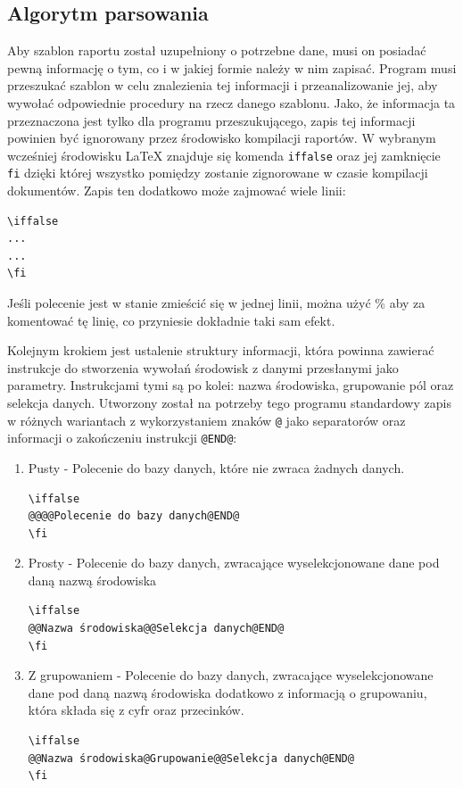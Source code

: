 \subsection{Algorytm parsowania}
Aby szablon raportu został uzupełniony o potrzebne dane, musi on posiadać pewną informację o tym, co i w jakiej formie należy w nim zapisać.  Program musi przeszukać szablon w celu znalezienia tej informacji i przeanalizowanie jej, aby wywołać odpowiednie procedury na rzecz danego szablonu. Jako, że informacja ta przeznaczona jest tylko dla programu przeszukującego, zapis tej informacji powinien być ignorowany przez środowisko kompilacji raportów.  W wybranym wcześniej środowisku LaTeX znajduje się komenda \texttt{iffalse} oraz jej zamknięcie \texttt{fi} dzięki której wszystko pomiędzy zostanie zignorowane w czasie kompilacji dokumentów. Zapis ten dodatkowo może zajmować wiele linii:
\begin{lstlisting}
\iffalse 
...
...
\fi
\end{lstlisting}
Jeśli polecenie jest w stanie zmieścić się w jednej linii, można użyć \% aby za komentować tę linię, co przyniesie dokładnie taki sam efekt.
\par
Kolejnym krokiem jest ustalenie struktury informacji, która powinna zawierać instrukcje do stworzenia wywołań środowisk z danymi przesłanymi jako parametry. Instrukcjami tymi są po kolei: nazwa środowiska, grupowanie pól oraz selekcja danych. Utworzony został  na potrzeby tego programu standardowy zapis w różnych wariantach z wykorzystaniem znaków \texttt{@} jako separatorów oraz informacji o zakończeniu instrukcji \texttt{@END@}:\vspace{5mm}
\begin{enumerate}
\item Pusty - Polecenie do bazy danych, które nie zwraca żadnych danych.
\begin{lstlisting}
\iffalse 
@@@@Polecenie do bazy danych@END@
\fi
\end{lstlisting}

\item Prosty - Polecenie do bazy danych, zwracające wyselekcjonowane dane pod daną nazwą środowiska
\begin{lstlisting}
\iffalse 
@@Nazwa środowiska@@Selekcja danych@END@
\fi
\end{lstlisting}

\item Z grupowaniem - Polecenie do bazy danych, zwracające wyselekcjonowane dane pod daną nazwą środowiska dodatkowo z informacją o grupowaniu, która składa się z cyfr oraz przecinków.
\begin{lstlisting}
\iffalse 
@@Nazwa środowiska@Grupowanie@@Selekcja danych@END@
\fi
\end{lstlisting}
\end{enumerate}

